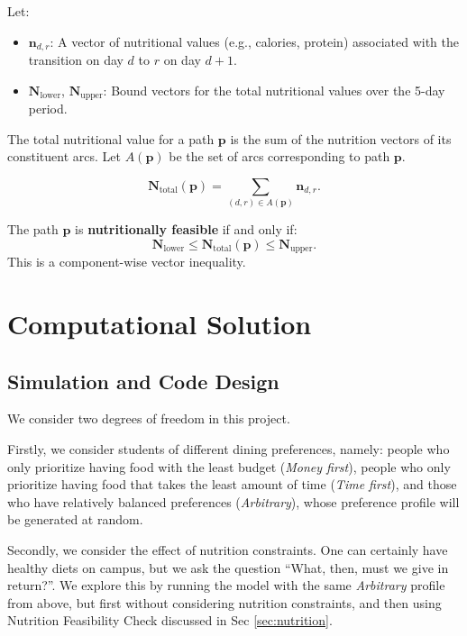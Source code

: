 \documentclass{article}
\begin{document}
Let:
\begin{itemize}
    \item $\mathbf{n}_{d,r}$: A vector of nutritional values (e.g., calories, protein) associated with the transition on day $d$ to $r$ on day $d+1$.
    \item $\mathbf{N}_{\text{lower}}$, $\mathbf{N}_{\text{upper}}$: Bound vectors for the total nutritional values over the 5-day period.
\end{itemize}

The total nutritional value for a path $\mathbf{p}$ is the sum of the nutrition vectors of its constituent arcs. Let $A(\mathbf{p})$ be the set of arcs corresponding to path $\mathbf{p}$.

$$\mathbf{N}_{\text{total}}(\mathbf{p}) = \sum_{(d,r) \in A(\mathbf{p})} \mathbf{n}_{d,r}.$$

The path $\mathbf{p}$ is \textbf{nutritionally feasible }if and only if:
$$
\mathbf{N}_{\text{lower}} \le \mathbf{N}_{\text{total}}(\mathbf{p}) \le \mathbf{N}_{\text{upper}}.
$$
This is a component-wise vector inequality.






\section{Computational Solution}

\subsection{Simulation and Code Design}
\label{sec:code_design}
We consider two degrees of freedom in this project. 

Firstly, we consider students of different dining preferences, namely: people who only prioritize having food with the least budget (\textit{Money first}), people who only prioritize having food that takes the least amount of time (\textit{Time first}), and those who have relatively balanced preferences (\textit{Arbitrary}), whose preference profile will be generated at random.

Secondly, we consider the effect of nutrition constraints. One can certainly have healthy diets on campus, but we ask the question ``What, then, must we give in return?''. We explore this by running the model with the same\textit{ Arbitrary} profile from above, but first without considering nutrition constraints, and then using Nutrition Feasibility Check discussed in Sec \ref{sec:nutrition}.
\end{document}
